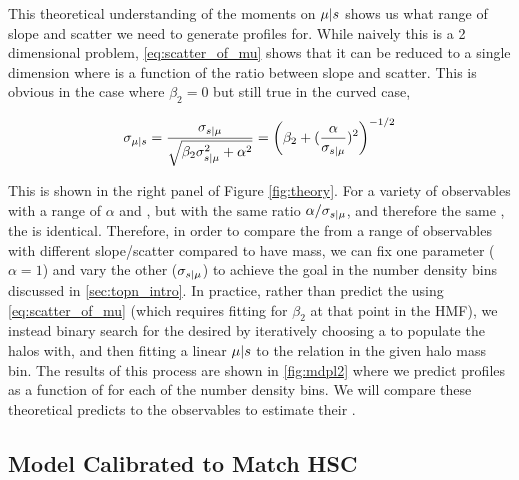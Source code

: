 \documentclass[a4paper,fleqn,usenatbib]{mnras}
\begin{document}
    This theoretical understanding of the moments on $\mu | s$ shows us what range of slope
    and scatter we need to generate \dsigma{} profiles for. While naively this is a 2 dimensional
    problem, \ref{eq:scatter_of_mu} shows that it can be reduced to a single dimension where
    \scatterMhaloObsSym{} is a function of the ratio between slope and scatter. This is obvious
    in the case where $\beta_2 = 0$ but still true in the curved case,

    \begin{equation}
        \sigma_{\mu{} | s{}}{} 
        	= \frac{\sigma_{s{} | \mu{}}}{\sqrt{\beta_2 \sigma_{s{} | \mu{}}^2 + \alpha^2}}
            = \left(\beta_2 + (\frac{\alpha}{\sigma_{s{} | \mu{}}})^2\right)^{-1/2}
        \label{eq:ratio_is_what_matters}
    \end{equation}
    
    This is shown in the right panel of Figure \ref{fig:theory}. For a variety of observables
    with a range of $\alpha$ and \scatterObsSymMhalo{}, but with the same ratio $\alpha /
    \sigma_{s{} | \mu{}}$, and therefore the same \scatterMhaloObsSym{}, the \dsigma{} is
    identical. Therefore, in order to compare the \dsigma{} from a range of observables with
    different slope/scatter compared to have mass, we can fix one parameter ($\alpha = 1$) and
    vary the other ($\sigma_{s{} | \mu{}}$) to achieve the goal \scatterMhaloObsSym{} in the
    number density bins discussed in \ref{sec:topn_intro}. In practice, rather than predict the
    \scatterMhaloObsSym{} using \ref{eq:scatter_of_mu} (which requires fitting for $\beta_2$ at
    that point in the HMF), we instead binary search for the desired \scatterMhaloObsSym{} by
    iteratively choosing a \scatterObsSymMhalo{} to populate the halos with, and then fitting a
    linear $\mu | s$ to the relation in the given halo mass bin. The results of this
    process are shown in \ref{fig:mdpl2} where we predict \dsigma{} profiles as a function of
    \scatterMhaloObsSym{} for each of the number density bins. We will compare these theoretical
    predicts to the observables to estimate their \scatterMhaloObsSym{}.

\subsection{Model Calibrated to Match HSC}
    \label{sec:halo_model}
\end{document}
